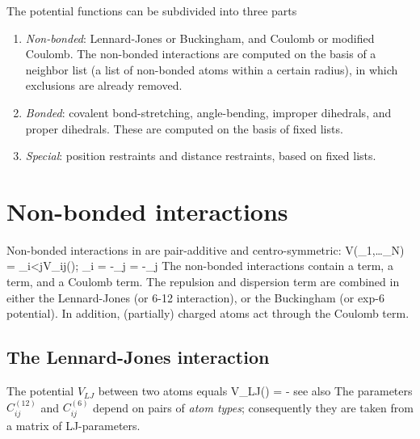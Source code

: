 The potential functions can be subdivided into three parts
\begin{enumerate}
\item   {\em Non-bonded}: Lennard-Jones or Buckingham, and Coulomb or
modified Coulomb. The non-bonded interactions are computed on the
basis of a neighbor list (a list of non-bonded atoms within a certain
radius), in which exclusions are already removed.
\item   {\em Bonded}: covalent bond-stretching, angle-bending,
improper dihedrals, and proper dihedrals. These are computed on the
basis of fixed lists. 
\item   {\em Special}: position restraints and distance restraints,
based on fixed lists. 
\end{enumerate}

\section{Non-bonded interactions}
Non-bonded interactions in {\gromacs} are pair-additive and centro-symmetric:
\beq
V(_1,\ldots {}_N) = \sum_{i<j}V_{ij}(\rvij);
\eeq
\beq
{}_i = -\sum_j   = -_j
\eeq
The non-bonded interactions contain a  term, 
a 
term, and a Coulomb term. The repulsion and dispersion term are
combined in either the Lennard-Jones (or 6-12 interaction), or the
Buckingham (or exp-6 potential). In addition, (partially) charged atoms
act through the Coulomb term. 

\subsection{The Lennard-Jones interaction}
\label{sec:lj}
The  potential $V_{LJ}$ between two atoms equals
\beq
V_{LJ}(\rij) =   -
\eeq
see also 
The parameters $C^{(12)}_{ij}$ and $C^{(6)}_{ij}$  depend on pairs of
{\em atom types}; consequently they are taken from a matrix of
LJ-parameters.

